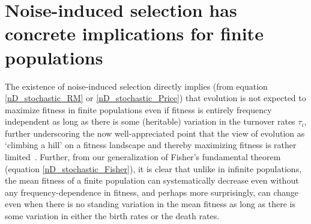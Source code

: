 \section{Noise-induced selection has concrete implications for finite populations}

The existence of noise-induced selection directly implies (from equation \eqref{nD_stochastic_RM} or \eqref{nD_stochastic_Price}) that evolution is not expected to maximize fitness in finite populations even if fitness is entirely frequency independent as long as there is some (heritable) variation in the turnover rates $\tau_i$, further underscoring the now well-appreciated point that the view of evolution as `climbing a hill' on a fitness landscape and thereby maximizing fitness is rather limited~\citep{grodwohl_theory_2017}. Further, from our generalization of Fisher's fundamental theorem (equation \eqref{nD_stochastic_Fisher}), it is clear that unlike in infinite populations, the mean fitness of a finite population can systematically decrease even without any frequency-dependence in fitness, and perhaps more surprisingly, can change even when there is no standing variation in the mean fitness as long as there is some variation in either the birth rates or the death rates.


